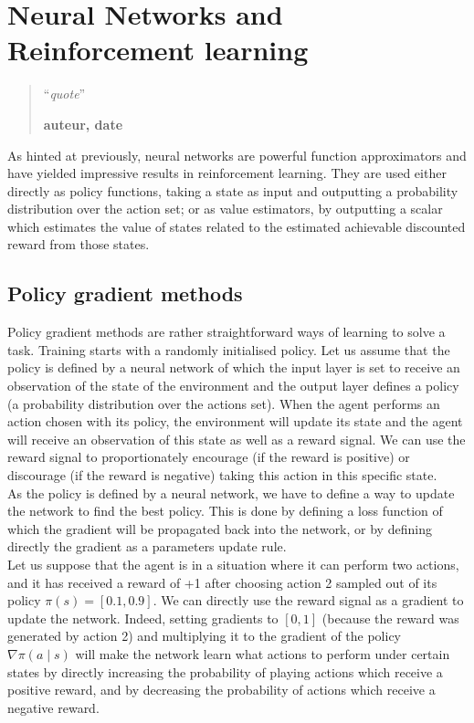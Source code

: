 \chapter{Neural Networks and Reinforcement learning}
\begin{quotation}
\noindent ``\emph{quote}''
\begin{flushright}\textbf{auteur, date}\end{flushright}
\end{quotation}

\vspace*{0.5cm}

As hinted at previously, neural networks are powerful function approximators and
have yielded impressive results in reinforcement learning. They are used either
directly as policy functions, taking a state as input and outputting a
probability distribution over the action set; or as value estimators, by 
outputting a scalar which estimates the value of states related to the
estimated achievable discounted reward from those states.

\section{Policy gradient methods}
Policy gradient methods are rather straightforward ways of learning to solve a task.
Training starts with a randomly initialised policy. Let us assume that the
policy is defined by a neural network of which the input layer is set to 
receive an observation of the state of the environment and the output layer
defines a policy (a probability distribution over the actions set).
When the agent performs an action chosen with its policy, the environment will
update its state and the agent will receive an observation of this state as
well as a reward signal. We can use the reward signal to proportionately
encourage (if the reward is 
positive) or discourage (if the reward is negative) taking this action in 
this specific state.\\

As the policy is defined by a neural network, we have to define a way to
update the network to find the best policy. This is done by defining a loss
function of which the gradient will be propagated back into the network, or
by defining directly the gradient as a parameters update rule.\\

Let us suppose that the agent is in a situation where it can perform two
actions, and it has received a reward of +1 after choosing action 2
sampled out of its policy $\pi(s) = [0.1, 0.9]$. We can directly use the
reward signal as a gradient to update the network. Indeed, setting gradients
to $[0, 1]$ (because the reward was generated by action 2) and multiplying it 
to the gradient of the policy $\nabla \pi(a \mid s)$ will make the network
learn what actions to perform under certain states by directly increasing the
probability of playing actions which receive a positive reward, and by
decreasing the probability of actions which receive a negative reward.\\

